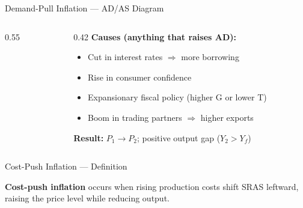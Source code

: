 \documentclass[16pt,aspectratio=169]{beamer}
\begin{document}
\begin{frame}{Demand-Pull Inflation --- AD/AS Diagram}
\begin{columns}
\begin{column}{0.55\textwidth}
\begin{center}
            \end{center}
        \end{column}
        \begin{column}{0.42\textwidth}
            \textbf{Causes (anything that raises AD):}
            \begin{itemize}\setlength\itemsep{0.2em}
                \item \small Cut in interest rates $\Rightarrow$ more borrowing
                \item \small Rise in consumer confidence
                \item \small Expansionary fiscal policy (higher G or lower T)
                \item \small Boom in trading partners $\Rightarrow$ higher exports
            \end{itemize}
            \vspace{0.3em}
            \textbf{Result:} $P_1 \to P_2$; positive output gap ($Y_2 > Y_f$)
        \end{column}
    \end{columns}
\end{frame}

\begin{frame}{Cost-Push Inflation --- Definition}
    \begin{definition}
        \textbf{Cost-push inflation} occurs when rising production costs shift SRAS leftward, raising the price level while reducing output.
    \end{definition}
\end{frame}
\end{document}
